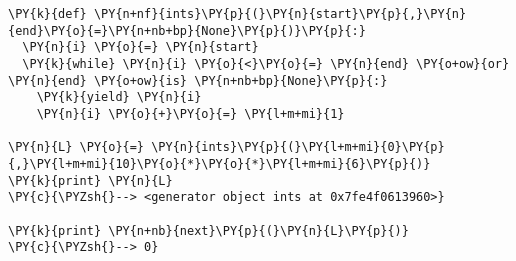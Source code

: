 \begin{Verbatim}[commandchars=\\\{\}]
\PY{k}{def} \PY{n+nf}{ints}\PY{p}{(}\PY{n}{start}\PY{p}{,}\PY{n}{end}\PY{o}{=}\PY{n+nb+bp}{None}\PY{p}{)}\PY{p}{:}
  \PY{n}{i} \PY{o}{=} \PY{n}{start}
  \PY{k}{while} \PY{n}{i} \PY{o}{<}\PY{o}{=} \PY{n}{end} \PY{o+ow}{or} \PY{n}{end} \PY{o+ow}{is} \PY{n+nb+bp}{None}\PY{p}{:}
    \PY{k}{yield} \PY{n}{i}
    \PY{n}{i} \PY{o}{+}\PY{o}{=} \PY{l+m+mi}{1}

\PY{n}{L} \PY{o}{=} \PY{n}{ints}\PY{p}{(}\PY{l+m+mi}{0}\PY{p}{,}\PY{l+m+mi}{10}\PY{o}{*}\PY{o}{*}\PY{l+m+mi}{6}\PY{p}{)}
\PY{k}{print} \PY{n}{L}
\PY{c}{\PYZsh{}--> <generator object ints at 0x7fe4f0613960>}

\PY{k}{print} \PY{n+nb}{next}\PY{p}{(}\PY{n}{L}\PY{p}{)}
\PY{c}{\PYZsh{}--> 0}
\end{Verbatim}
